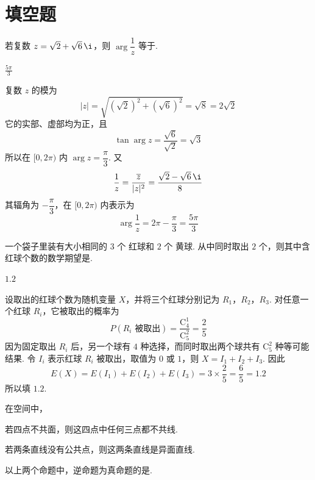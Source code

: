 \section{填空题}
\begin{problem}
若复数 \(z=\sqrt{2}+\sqrt{6}\,\i\)，则 \(\arg\dfrac{1}{z}\) 等于\fillinblank{}.
\end{problem}

\begin{answer}
\(\frac{5\pi}{3}\)
\end{answer}

\begin{solution}
复数 \(z\) 的模为
\[
\lvert z\rvert=\sqrt{(\sqrt2)^2+(\sqrt6)^2}=\sqrt8=2\sqrt2
\]
它的实部、虚部均为正，且
\[
\tan\arg z=\frac{\sqrt6}{\sqrt2}=\sqrt3
\]
所以在 \([0,2\pi)\) 内 \(\arg z=\dfrac\pi3\). 又
\[
\frac1z=\frac{\overline z}{\lvert z\rvert^2}=\frac{\sqrt2-\sqrt6\,\i}{8}
\]
其辐角为 \(-\dfrac\pi3\)，在 \([0,2\pi)\) 内表示为
\[
\arg\frac1z=2\pi-\frac\pi3=\frac{5\pi}{3}
\]
\end{solution}

\begin{problem}
一个袋子里装有大小相同的 \(3\text{ 个}\) 红球和 \(2\text{ 个}\) 黄球. 从中同时取出 \(2\text{ 个}\)，则其中含红球个数的数学期望是\fillinblank{}.
\end{problem}

\begin{answer}
\(1.2\)
\end{answer}

\begin{solution}
设取出的红球个数为随机变量 \(X\)，并将三个红球分别记为 \(R_1\)，\(R_2\)，\(R_3\). 对任意一个红球 \(R_i\)，它被取出的概率为
\[
P(R_i\text{ 被取出})=\frac{\mathrm C_4^1}{\mathrm C_5^2}=\frac25
\]
因为固定取出 \(R_i\) 后，另一个球有 \(4\) 种选择，而同时取出两个球共有 \(\mathrm C_5^2\) 种等可能结果. 令 \(I_i\) 表示红球 \(R_i\) 被取出，取值为 \(0\) 或 \(1\)，则 \(X=I_1+I_2+I_3\). 因此
\[
E(X)=E(I_1)+E(I_2)+E(I_3)=3\times\frac25=\frac65=1.2
\]
所以填 \(1.2\).
\end{solution}

\begin{problem}
在空间中，

\begin{circlelist}
\item 若四点不共面，则这四点中任何三点都不共线.
\item 若两条直线没有公共点，则这两条直线是异面直线.
\end{circlelist}

以上两个命题中，逆命题为真命题的是\fillinblank{}.
\end{problem}

